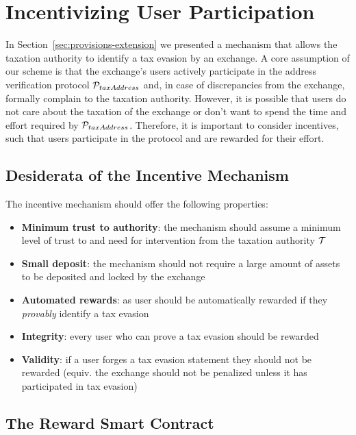 \section{Incentivizing User Participation}\label{sec:incentives}

In Section~\ref{sec:provisions-extension} we presented a mechanism that allows
the taxation authority to identify a tax evasion by an exchange. A core
assumption of our scheme is that the exchange's users actively participate in
the address verification protocol $\mathcal{P}_{taxAddress}$ and, in case of
discrepancies from the exchange, formally complain to the taxation authority.
However, it is possible that users do not care about the taxation of the
exchange or don't want to spend the time and effort required by
$\mathcal{P}_{taxAddress}$. Therefore, it is important to consider incentives,
such that users participate in the protocol and are rewarded for their effort.

\subsection{Desiderata of the Incentive Mechanism}\label{subsec:incentive-desiderata}

The incentive mechanism should offer the following properties:

\begin{itemize}
    \item \textbf{Minimum trust to authority}: the mechanism should assume a
        minimum level of trust to and need for intervention from the taxation
        authority $\mathcal{T}$
    \item \textbf{Small deposit}: the mechanism should not require a large
        amount of assets to be deposited and locked by the exchange
    \item \textbf{Automated rewards}: as user should be automatically
        rewarded if they \emph{provably} identify a tax evasion
    \item \textbf{Integrity}: every user who can prove a tax evasion should be
        rewarded
    \item \textbf{Validity}: if a user forges a tax evasion statement they
        should not be rewarded (equiv. the exchange should not be penalized
        unless it has participated in tax evasion)
\end{itemize}

\subsection{The Reward Smart Contract}\label{subsec:reward-contract}

